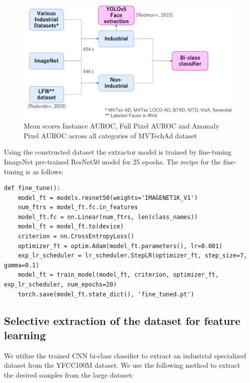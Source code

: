 \begin{figure}[h]
	\begin{center}
		\includegraphics[width=1.0\linewidth]{Chapter_4/bi_class_prep.png}
	\end{center}
	\caption{Mean scores Instance AUROC, Full Pixel AUROC and Anomaly Pixel AUROC across all categories of MVTechAd dataset}
	\label{fig:bi_class_prep}
\end{figure}

Using the constructed dataset the extractor model is trained by fine-tuning ImageNet pre-trained ResNet50 model for 25 epochs. The recipe for the fine-tuning is as follows:

\begin{lstlisting}
def fine_tune():
	model_ft = models.resnet50(weights='IMAGENET1K_V1')
	num_ftrs = model_ft.fc.in_features
	model_ft.fc = nn.Linear(num_ftrs, len(class_names))
	model_ft = model_ft.to(device)
	criterion = nn.CrossEntropyLoss()
	optimizer_ft = optim.Adam(model_ft.parameters(), lr=0.001)
	exp_lr_scheduler = lr_scheduler.StepLR(optimizer_ft, step_size=7, gamma=0.1)
	model_ft = train_model(model_ft, criterion, optimizer_ft, exp_lr_scheduler, num_epochs=20)
	torch.save(model_ft.state_dict(), 'fine_tuned.pt')
\end{lstlisting}

\subsection{Selective extraction of the dataset for feature learning}
We utilize the trained CNN bi-class classifier to extract an industrial specialized dataset from the YFCC100M dataset. We use the following method to extract the desired samples from the large dataset:


